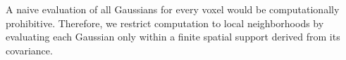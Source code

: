 \documentclass[runningheads]{llncs}
\begin{document}

A naive evaluation of all Gaussians for every voxel would be computationally prohibitive. Therefore, we restrict computation to local neighborhoods by evaluating each Gaussian only within a finite spatial support derived from its covariance. %




\end{document}

